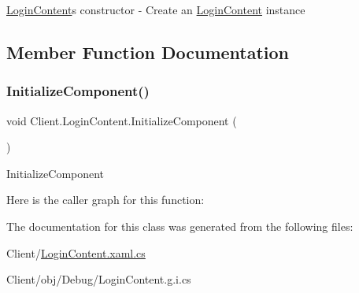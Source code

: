 \hyperlink{class_client_1_1_login_content}{Login\+Content}\textquotesingle{}s constructor -\/ Create an \hyperlink{class_client_1_1_login_content}{Login\+Content} instance 

\subsection{Member Function Documentation}
\mbox{\label{class_client_1_1_login_content_aab28ba890ab8be2085b04183cef1b696}} 
\subsubsection{\texorpdfstring{Initialize\+Component()}{InitializeComponent()}}
{\footnotesize\ttfamily void Client.\+Login\+Content.\+Initialize\+Component (\begin{DoxyParamCaption}{ }\end{DoxyParamCaption})\hspace{0.3cm}{\ttfamily [inline]}}



Initialize\+Component 

Here is the caller graph for this function\+:


The documentation for this class was generated from the following files\+:\begin{DoxyCompactItemize}
\item 
Client/\hyperlink{_login_content_8xaml_8cs}{Login\+Content.\+xaml.\+cs}\item 
Client/obj/\+Debug/Login\+Content.\+g.\+i.\+cs\end{DoxyCompactItemize}
